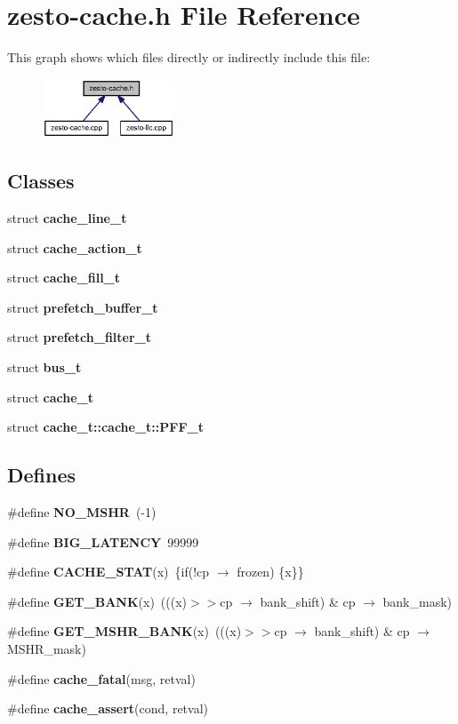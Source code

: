 \section{zesto-cache.h File Reference}
\label{config_2zesto-cache_8h}


This graph shows which files directly or indirectly include this file:\nopagebreak
\begin{figure}[H]
\begin{center}
\leavevmode
\includegraphics[width=111pt]{config_2zesto-cache_8h__dep__incl}
\end{center}
\end{figure}
\subsection*{Classes}
\begin{CompactItemize}
\item 
struct {\bf cache\_\-line\_\-t}
\item 
struct {\bf cache\_\-action\_\-t}
\item 
struct {\bf cache\_\-fill\_\-t}
\item 
struct {\bf prefetch\_\-buffer\_\-t}
\item 
struct {\bf prefetch\_\-filter\_\-t}
\item 
struct {\bf bus\_\-t}
\item 
struct {\bf cache\_\-t}
\item 
struct {\bf cache\_\-t::cache\_\-t::PFF\_\-t}
\end{CompactItemize}
\subsection*{Defines}
\begin{CompactItemize}
\item 
\#define {\bf NO\_\-MSHR}~(-1)
\item 
\#define {\bf BIG\_\-LATENCY}~99999
\item 
\#define {\bf CACHE\_\-STAT}(x)~\{if(!cp $\rightarrow$ frozen) \{x\}\}
\item 
\#define {\bf GET\_\-BANK}(x)~(((x)$>$$>$cp $\rightarrow$ bank\_\-shift) \& cp $\rightarrow$ bank\_\-mask)
\item 
\#define {\bf GET\_\-MSHR\_\-BANK}(x)~(((x)$>$$>$cp $\rightarrow$ bank\_\-shift) \& cp $\rightarrow$ MSHR\_\-mask)
\item 
\#define {\bf cache\_\-fatal}(msg, retval)
\item 
\#define {\bf cache\_\-assert}(cond, retval)
\end{CompactItemize}
